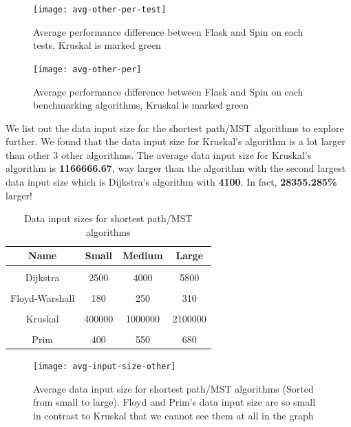 \begin{figure}[hp]
\centering
\texttt{[image: avg-other-per-test]}
\caption{\footnotesize{Average performance difference between Flask and Spin on each tests, Kruskal is marked green}}
\captionsetup{aboveskip=0pt,font=it}
\end{figure}

\newpage
\bigskip
\begin{figure}[hp]
\centering
\texttt{[image: avg-other-per]}
\caption{\footnotesize{Average performance difference between Flask and Spin on each benchmarking algorithms, Kruskal is marked green}}
\captionsetup{aboveskip=0pt,font=it}
\end{figure}
\bigskip

We list out the data input size for the shortest path/MST algorithms to explore further. We found that the data input size for Kruskal’s algorithm is a lot larger than other 3 other algorithms. The average data input size for Kruskal’s algorithm is \textbf{1166666.67}, way larger than the algorithm with the second largest data input size which is Dijkstra's algorithm with \textbf{4100}. In fact, \textbf{28355.285\%} larger!

\bigskip
\begin{table}[h!]
\centering
\begin{tabular}{||c c c c||} 
\hline
Name & Small & Medium & Large \\ [1ex] 
\hline\hline
 & & & \\
Dijkstra & 2500 & 4000 & 5800 \\ 
 & & & \\
Floyd-Warshall & 180 & 250 & 310 \\ 
 & & & \\
Kruskal & 400000 & 1000000 & 2100000 \\ 
 & & & \\
Prim & 400 & 550 & 680 \\ [1ex]
\hline
\end{tabular}
\caption{Data input sizes for shortest path/MST algorithms}
\label{table:time_complexity_1}
\end{table}
\bigskip

\newpage
\bigskip
\begin{figure}[hp]
\centering
\texttt{[image: avg-input-size-other]}
\caption{\footnotesize{Average data input size for shortest path/MST algorithms (Sorted from small to large). Floyd and Prim's data input size are so small in contrast to Kruskal that we cannot see them at all in the graph}}
\captionsetup{aboveskip=0pt,font=it}
\end{figure}
\bigskip

